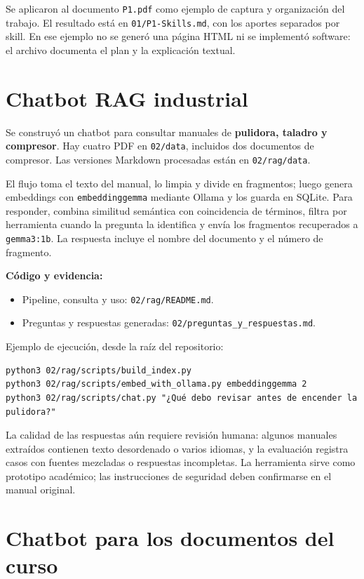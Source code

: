 \documentclass[14pt,twoside]{article}
\begin{document}
Se aplicaron al documento \texttt{P1.pdf} como ejemplo de captura y organización del trabajo. El resultado está en \texttt{01/P1-Skills.md}, con los aportes separados por skill. En ese ejemplo no se generó una página HTML ni se implementó software: el archivo documenta el plan y la explicación textual.

\section{Chatbot RAG industrial}

Se construyó un chatbot para consultar manuales de \textbf{pulidora, taladro y compresor}. Hay cuatro PDF en \texttt{02/data}, incluidos dos documentos de compresor. Las versiones Markdown procesadas están en \texttt{02/rag/data}.

El flujo toma el texto del manual, lo limpia y divide en fragmentos; luego genera embeddings con \texttt{embeddinggemma} mediante Ollama y los guarda en SQLite. Para responder, combina similitud semántica con coincidencia de términos, filtra por herramienta cuando la pregunta la identifica y envía los fragmentos recuperados a \texttt{gemma3:1b}. La respuesta incluye el nombre del documento y el número de fragmento.

\textbf{Código y evidencia:}

\begin{itemize}
\item Pipeline, consulta y uso: \texttt{02/rag/README.md}.
\item Preguntas y respuestas generadas: \texttt{02/preguntas\_y\_respuestas.md}.
\end{itemize}

Ejemplo de ejecución, desde la raíz del repositorio:

\begin{verbatim}
python3 02/rag/scripts/build_index.py
python3 02/rag/scripts/embed_with_ollama.py embeddinggemma 2
python3 02/rag/scripts/chat.py "¿Qué debo revisar antes de encender la pulidora?"
\end{verbatim}

La calidad de las respuestas aún requiere revisión humana: algunos manuales extraídos contienen texto desordenado o varios idiomas, y la evaluación registra casos con fuentes mezcladas o respuestas incompletas. La herramienta sirve como prototipo académico; las instrucciones de seguridad deben confirmarse en el manual original.

\section{Chatbot para los documentos del curso}
\end{document}
